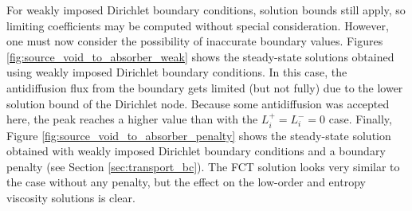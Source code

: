 For weakly imposed Dirichlet boundary conditions, solution bounds
still apply, so limiting coefficients may be computed without special
consideration. However, one must now consider the possibility of
inaccurate boundary values.
Figures \ref{fig:source_void_to_absorber_weak} shows the steady-state 
solutions obtained using weakly imposed Dirichlet boundary conditions.
In this case, the antidiffusion flux from the boundary gets limited
(but not fully) due to the lower solution bound of the Dirichlet node.
Because some antidiffusion was accepted here, the peak reaches
a higher value than with the $L_i^+=L_i^-=0$ case.
Finally, Figure \ref{fig:source_void_to_absorber_penalty} shows
the steady-state solution obtained with weakly imposed Dirichlet
boundary conditions and a boundary penalty (see Section \ref{sec:transport_bc}).
The FCT solution looks very similar to the case without any penalty,
but the effect on the low-order and entropy viscosity solutions is
clear.


